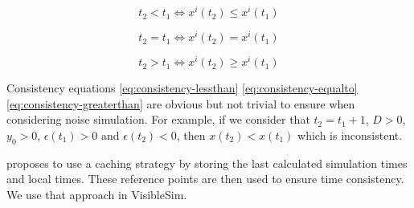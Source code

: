 \documentclass[11pt]{article}
\begin{document}
\begin{equation}
t_2 < t_1 \iff x^i(t_2) \leq x^i(t_1)
\label{eq:consistency-lessthan}
\end{equation}

\begin{equation}
t_2 = t_1 \iff x^i(t_2) = x^i(t_1)
\label{eq:consistency-equalto}
\end{equation}

\begin{equation}
t_2 > t_1 \iff x^i(t_2) \geq x^i(t_1)
\label{eq:consistency-greaterthan}
\end{equation}

Consistency equations \eqref{eq:consistency-lessthan} \eqref{eq:consistency-equalto} \eqref{eq:consistency-greaterthan} are obvious but not trivial to ensure when considering noise simulation. For example, if we consider that $t_2 = t_1 + 1$, $D > 0$, $y_0 > 0$, $\epsilon(t_1) > 0$ and $\epsilon(t_2) < 0$, then $x(t_2) < x(t_1)$ which is inconsistent.

\cite{ring2010clock} proposes to use a caching strategy by storing the last calculated simulation times and local times. These reference points are then used to ensure time consistency. We use that approach in VisibleSim.



\end{document}
